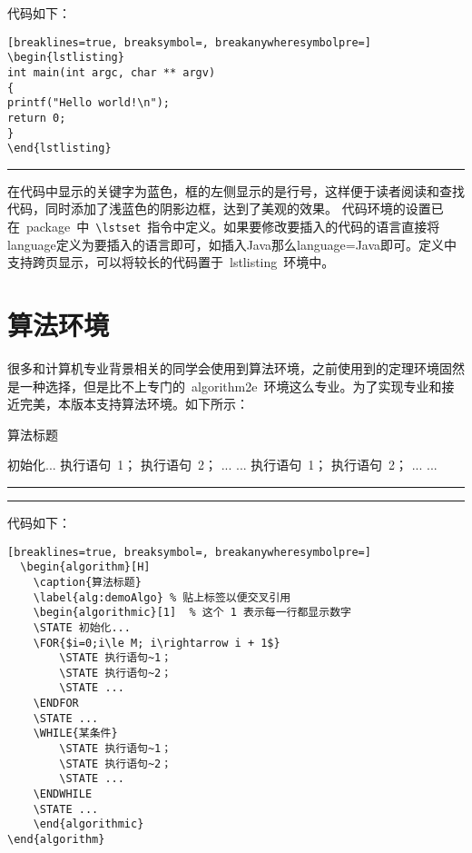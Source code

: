 \vspace{1em}

\noindent 代码如下：
\begin{Verbatim}[breaklines=true, breaksymbol=, breakanywheresymbolpre=]
\begin{lstlisting}
int main(int argc, char ** argv)
{
printf("Hello world!\n");
return 0;
}
\end{lstlisting}
\end{Verbatim}
\noindent\hrule\vspace{1em}

在代码中显示的关键字为蓝色，框的左侧显示的是行号，这样便于读者阅读和查找代码，同时添加了浅蓝色的阴影边框，达到了美观的效果。
代码环境的设置已在~package~中~\verb|\lstset|~指令中定义。如果要修改要插入的代码的语言直接将language定义为要插入的语言即可，如插入Java那么language=Java即可。定义中支持跨页显示，可以将较长的代码置于~lstlisting~环境中。
\section{算法环境}
很多和计算机专业背景相关的同学会使用到算法环境，之前使用到的定理环境固然是一种选择，但是比不上专门的~algorithm2e~环境这么专业。为了实现专业和接近完美，本版本支持算法环境。如下所示：
\begin{algorithm}[H]
    \caption{算法标题}
    \label{alg:demoAlgo} %
    \begin{algorithmic}[1]  %
    \STATE 初始化...
        \STATE 执行语句~1；
        \STATE 执行语句~2；
        \STATE ...
    \ENDFOR
    \STATE ...
        \STATE 执行语句~1；
        \STATE 执行语句~2；
        \STATE ...
    \ENDWHILE
    \STATE ...
    \end{algorithmic}
\end{algorithm}
\noindent\hrule
\vspace{0.1em}\noindent\hrule

\vspace{1em}

\noindent 代码如下：
\begin{Verbatim}[breaklines=true, breaksymbol=, breakanywheresymbolpre=]
  \begin{algorithm}[H]
    \caption{算法标题}
    \label{alg:demoAlgo} % 贴上标签以便交叉引用
    \begin{algorithmic}[1]  % 这个 1 表示每一行都显示数字
    \STATE 初始化...
    \FOR{$i=0;i\le M; i\rightarrow i + 1$}
        \STATE 执行语句~1；
        \STATE 执行语句~2；
        \STATE ...
    \ENDFOR
    \STATE ...
    \WHILE{某条件}
        \STATE 执行语句~1；
        \STATE 执行语句~2；
        \STATE ...
    \ENDWHILE
    \STATE ...
    \end{algorithmic}
\end{algorithm}
\end{Verbatim}

